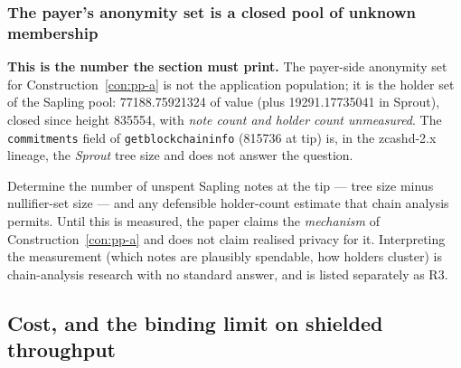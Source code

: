 \subsubsection{The payer's anonymity set is a closed pool of unknown membership}

\textbf{This is the number the section must print.} The payer-side anonymity set for
Construction~\ref{con:pp-a} is not the application population; it is the holder set of the Sapling
pool: \num{77188.75921324}\flux{} of value (plus \num{19291.17735041}\flux{} in Sprout), closed since
height \num{835554}, with \emph{note count and holder count unmeasured}. The
\texttt{commitments} field of \texttt{getblockchaininfo} (\num{815736} at tip) is, in the zcashd-2.x
lineage, the \emph{Sprout} tree size and does not answer the question.

\begin{openproblem}
\label{op:pp-m1}
Determine the number of unspent Sapling notes at the tip --- tree size minus nullifier-set size ---
and any defensible holder-count estimate that chain analysis permits. Until this is measured, the
paper claims the \emph{mechanism} of Construction~\ref{con:pp-a} and does not claim realised privacy
for it. Interpreting the measurement (which notes are plausibly spendable, how holders cluster) is
chain-analysis research with no standard answer, and is listed separately as R3.
\end{openproblem}

\subsection{Cost, and the binding limit on shielded throughput}
\label{sec:pp-cost}

